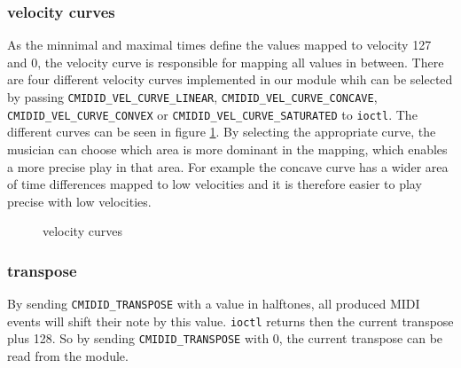 \documentclass[paper=a4,fontsize=11pt,twocolumn,pagesize,bibtotoc]{scrartcl}
\begin{document}
\subsubsection{velocity curves}
\label{vel}
As the minnimal and maximal times define the values mapped to velocity 127 and 0, the velocity curve is responsible for mapping all values in between. There are four different velocity curves implemented in our module whih can be selected by passing \texttt{CMIDID\_VEL\_CURVE\_LINEAR}, \texttt{CMIDID\_VEL\_CURVE\_CONCAVE}, \texttt{CMIDID\_VEL\_CURVE\_CONVEX} or \texttt{CMIDID\_VEL\_CURVE\_SATURATED} to \texttt{ioctl}. The different curves can be seen in figure \ref{fig:vel}. By selecting the appropriate curve, the musician can choose which area is more dominant in the mapping, which enables a more precise play in that area. For example the concave curve has a wider area of time differences mapped to low velocities and it is therefore easier to play precise with low velocities.

\begin{figure}
	\centering
	\caption{velocity curves}
		\label{fig:vel}
\end{figure}

\subsubsection{transpose}
By sending \texttt{CMIDID\_TRANSPOSE} with a value in halftones, all produced MIDI events will shift their note by this value. \texttt{ioctl} returns then the current transpose plus 128. So by sending \texttt{CMIDID\_TRANSPOSE} with 0, the current transpose can be read from the module.
\end{document}
